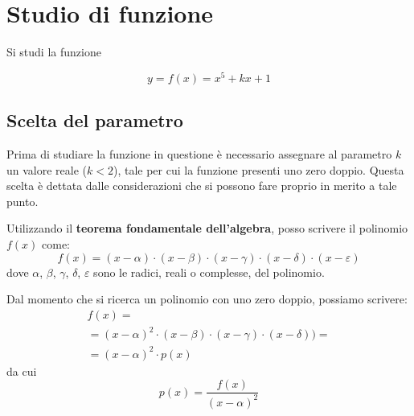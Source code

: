 \documentclass[a4paper, oneside, titlepage, reqno]{book}
\begin{document}
\chapter{Studio di funzione}

Si studi la funzione 

\begin{equation}
y=f(x)=x^5+kx+1
\end{equation}

\section{Scelta del parametro}

Prima di studiare la funzione in questione è necessario assegnare al parametro $k$ un valore reale ($k<2$), tale per cui  la funzione presenti uno zero doppio. Questa scelta è dettata dalle considerazioni che si possono fare proprio in merito a tale punto.

Utilizzando il \textbf{teorema fondamentale dell'algebra}\supercite{courant:mate}, posso scrivere il polinomio $f(x)$ come:
\[
f(x)=(x-\alpha)\cdot(x-\beta)\cdot(x-\gamma)\cdot(x-\delta)\cdot(x-\varepsilon)
\]
dove $\alpha$, $\beta$, $\gamma$, $\delta$, $\varepsilon$ sono le radici, reali o complesse, del polinomio.

Dal momento che si ricerca un polinomio con uno zero doppio, possiamo scrivere:
\begin{multline*}
f(x)=\\
=(x-\alpha)^2\cdot(x-\beta)\cdot(x-\gamma)\cdot(x-\delta))=\\
=(x-\alpha)^2\cdot p(x)
\end{multline*}
da cui
\[
p(x)=\frac{f(x)}{(x-\alpha)^2}
\]
\end{document}
